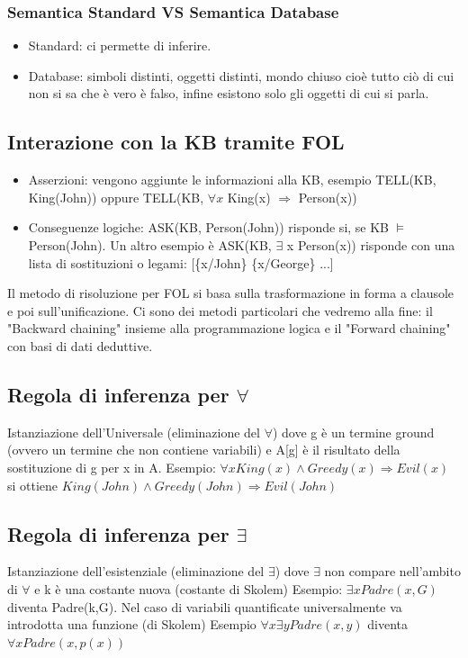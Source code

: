 \documentclass{article}
\begin{document}
\subsubsection{Semantica Standard VS Semantica Database}
\begin{itemize}
    \item Standard: ci permette di inferire.
    \item Database: simboli distinti, oggetti distinti, mondo chiuso cioè tutto ciò di cui non si sa che è vero è falso, infine esistono solo gli oggetti di cui si parla.
\end{itemize}

\subsection{Interazione con la KB tramite FOL}
\begin{itemize}
    \item Asserzioni: vengono aggiunte le informazioni alla KB, esempio TELL(KB, King(John)) oppure TELL(KB, $\forall x$ King(x) $\Rightarrow$ Person(x))
    \item Conseguenze logiche: ASK(KB, Person(John)) risponde si, se KB $\models$ Person(John). Un altro esempio è ASK(KB, $\exists$ x Person(x)) risponde con una lista di sostituzioni o legami: [\{x/John\} \{x/George\} ...]
\end{itemize}
Il metodo di risoluzione per FOL si basa sulla trasformazione in forma a clausole e poi sull'unificazione. Ci sono dei metodi particolari che vedremo alla fine: il "Backward chaining" insieme alla programmazione logica e il "Forward chaining" con basi di dati deduttive.

\subsection{Regola di inferenza per $\forall$}
Istanziazione dell’Universale (eliminazione del $\forall$) \quad
{} \newline
dove g è un termine ground (ovvero un termine che non contiene variabili) e A[g] è il risultato della sostituzione di g per x in A.\newline
Esempio: $\forall x King(x) \land Greedy(x) \Rightarrow Evil(x)$ si ottiene $ King(John) \land Greedy(John) \Rightarrow Evil(John)$

\subsection{Regola di inferenza per $\exists$}
Istanziazione dell'esistenziale (eliminazione del $\exists$) \quad 
{} \newline
dove $\exists$ non compare nell'ambito di $\forall$ e k è una costante nuova (costante di Skolem) \newline
Esempio: $\exists x Padre(x,G)$ diventa Padre(k,G). \newline
Nel caso di variabili quantificate universalmente va introdotta una funzione (di Skolem) \newline
Esempio $\forall x \exists y Padre(x, y)$ diventa $\forall x Padre(x, p(x))$
\end{document}
